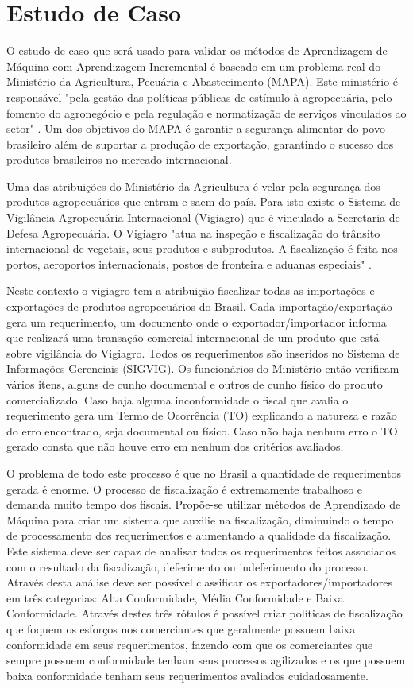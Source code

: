 \chapter{Estudo de Caso}
O estudo de caso que será usado para validar os métodos de Aprendizagem de Máquina com Aprendizagem Incremental é baseado em um problema real do Ministério da Agricultura, Pecuária e Abastecimento (MAPA). Este ministério é responsável  "pela gestão das políticas públicas de estímulo à agropecuária, pelo fomento do agronegócio e pela regulação e normatização de serviços vinculados ao setor" \cite{mapa}. Um dos objetivos do MAPA é garantir a segurança alimentar do povo brasileiro além de suportar a produção de exportação, garantindo o sucesso dos produtos brasileiros no mercado internacional.

Uma das atribuições do Ministério da Agricultura é velar pela segurança dos produtos agropecuários que entram e saem do país. Para isto existe o Sistema de Vigilância Agropecuária Internacional (Vigiagro) que é vinculado a Secretaria de Defesa Agropecuária. O Vigiagro "atua na inspeção e fiscalização do trânsito internacional de vegetais, seus produtos e subprodutos. A fiscalização é feita nos portos, aeroportos internacionais, postos de fronteira e aduanas especiais" \cite{vigiagro}.

Neste contexto o vigiagro tem a atribuição fiscalizar todas as importações e exportações de produtos agropecuários do Brasil. Cada importação/exportação gera um requerimento, um documento onde o exportador/importador informa que realizará uma transação comercial internacional de um produto que está sobre vigilância do Vigiagro. Todos os requerimentos são inseridos no Sistema de Informações Gerenciais (SIGVIG). Os funcionários do Ministério então verificam vários itens, alguns de cunho documental e outros de cunho físico do produto comercializado. Caso haja alguma inconformidade o fiscal que avalia o requerimento gera um Termo de Ocorrência (TO) explicando a natureza e razão do erro encontrado, seja documental ou físico. Caso não haja nenhum erro o TO gerado consta que não houve erro em nenhum dos critérios avaliados.

O problema de todo este processo é que no Brasil a quantidade de requerimentos gerada é enorme. O processo de fiscalização é extremamente trabalhoso e demanda muito tempo dos fiscais. Propõe-se utilizar métodos de Aprendizado de Máquina para criar um sistema que auxilie na fiscalização, diminuindo o tempo de processamento dos requerimentos e aumentando a qualidade da fiscalização. Este sistema deve ser capaz de analisar todos os requerimentos feitos associados com o resultado da fiscalização, deferimento ou indeferimento do processo. Através desta análise deve ser possível classificar os exportadores/importadores em três categorias: Alta Conformidade, Média Conformidade e Baixa Conformidade. Através destes três rótulos é possível criar políticas de fiscalização que foquem os esforços nos comerciantes que geralmente possuem baixa conformidade em seus requerimentos, fazendo com que os comerciantes que sempre possuem conformidade tenham seus processos agilizados e os que possuem baixa conformidade tenham seus requerimentos avaliados cuidadosamente. 

